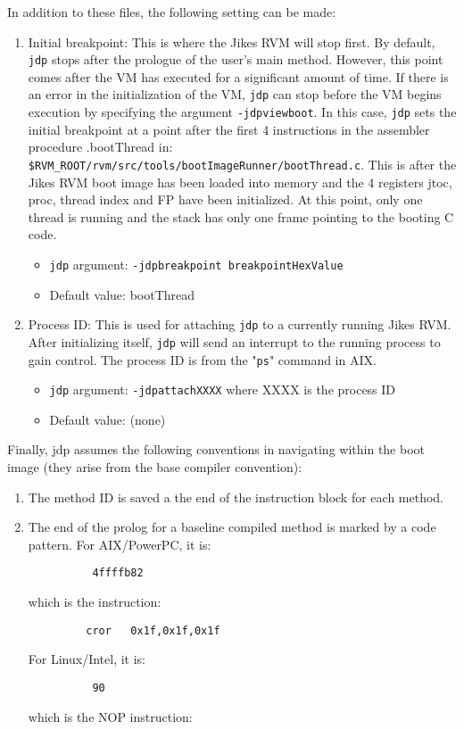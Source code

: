 In addition to these files, the following setting can be made:

\begin{enumerate}
\item Initial breakpoint:  
   This is where the Jikes RVM will stop first.  By default, {\tt jdp} stops
   after the prologue of the user's main method.  However, this point
   comes after the VM has executed for a significant amount of time.
   If there is an error in the initialization of the VM, {\tt jdp} can stop
   before the VM begins execution by specifying the argument {\tt -jdpviewboot}.
   In this case, {\tt jdp} sets the initial breakpoint at a point after the
   first 4 instructions in the assembler procedure .bootThread in:
        {\tt \$RVM\_ROOT/rvm/src/tools/bootImageRunner/bootThread.c}.
   This is after the Jikes RVM boot image has been loaded into memory and
   the 4 registers jtoc, proc, thread index and FP have been initialized.
   At this point, only one thread is running and the stack has only 
   one frame pointing to the booting C code.
\begin{itemize}
\item   {\tt jdp} argument:     {\tt -jdpbreakpoint breakpointHexValue}
\item    Default value:         bootThread
\end{itemize}

\item Process ID:
   This is used for attaching {\tt jdp} to a currently running Jikes RVM.  After 
   initializing itself, {\tt jdp} will send an interrupt to the running process 
   to gain control.  The process ID is from the "{\tt ps}" command in AIX\AIXTMFootnote.
\begin{itemize}
\item   {\tt jdp} argument:     {\tt -jdpattachXXXX} where XXXX is the process ID
\item    Default value:         (none)
\end{itemize}
\end{enumerate}


Finally, jdp assumes the following conventions in navigating within the 
boot image (they arise from the base compiler convention):

\begin{enumerate}
\item The method ID is saved a the end of the instruction block for each
   method.

\item The end of the prolog for a baseline compiled method is marked by a code pattern.
For AIX/PowerPC\PowerPCTMFootnote, it is:
\begin{verbatim}
          4ffffb82      
\end{verbatim}
   which is the instruction:

\begin{verbatim}
         cror   0x1f,0x1f,0x1f
\end{verbatim}
For Linux/Intel, it is:
\begin{verbatim}
          90
\end{verbatim}
   which is the NOP instruction:
\end{enumerate}

